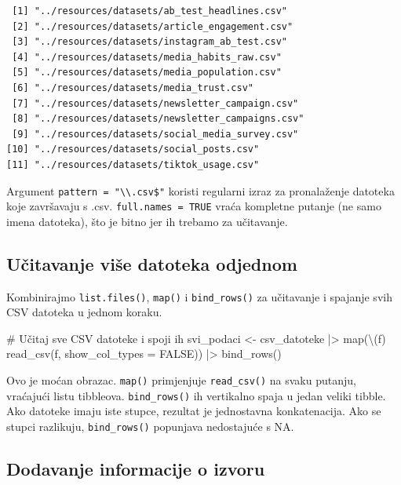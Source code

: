 \documentclass[
  croatian,
  letterpaper,
  DIV=11,
  numbers=noendperiod]{scrartcl}
\newenvironment{Shaded}{\begin{snugshade}}{\end{snugshade}}
\newcommand{\AttributeTok}[1]{\textcolor[rgb]{0.40,0.45,0.13}{#1}}
\newcommand{\CommentTok}[1]{\textcolor[rgb]{0.37,0.37,0.37}{#1}}
\newcommand{\ConstantTok}[1]{\textcolor[rgb]{0.56,0.35,0.01}{#1}}
\newcommand{\FunctionTok}[1]{\textcolor[rgb]{0.28,0.35,0.67}{#1}}
\newcommand{\NormalTok}[1]{\textcolor[rgb]{0.00,0.23,0.31}{#1}}
\newcommand{\OtherTok}[1]{\textcolor[rgb]{0.00,0.23,0.31}{#1}}
\newcommand{\SpecialCharTok}[1]{\textcolor[rgb]{0.37,0.37,0.37}{#1}}
\begin{document}
\begin{verbatim}
 [1] "../resources/datasets/ab_test_headlines.csv"   
 [2] "../resources/datasets/article_engagement.csv"  
 [3] "../resources/datasets/instagram_ab_test.csv"   
 [4] "../resources/datasets/media_habits_raw.csv"    
 [5] "../resources/datasets/media_population.csv"    
 [6] "../resources/datasets/media_trust.csv"         
 [7] "../resources/datasets/newsletter_campaign.csv" 
 [8] "../resources/datasets/newsletter_campaigns.csv"
 [9] "../resources/datasets/social_media_survey.csv" 
[10] "../resources/datasets/social_posts.csv"        
[11] "../resources/datasets/tiktok_usage.csv"        
\end{verbatim}

Argument \texttt{pattern\ =\ "\textbackslash{}\textbackslash{}.csv\$"}
koristi regularni izraz za pronalaženje datoteka koje završavaju s .csv.
\texttt{full.names\ =\ TRUE} vraća kompletne putanje (ne samo imena
datoteka), što je bitno jer ih trebamo za učitavanje.

\subsection{Učitavanje više datoteka
odjednom}\label{uux10ditavanje-viux161e-datoteka-odjednom}

Kombinirajmo \texttt{list.files()}, \texttt{map()} i
\texttt{bind\_rows()} za učitavanje i spajanje svih CSV datoteka u
jednom koraku.

\begin{Shaded}
\begin{Highlighting}[]
\CommentTok{\# Učitaj sve CSV datoteke i spoji ih}
\NormalTok{svi\_podaci }\OtherTok{\textless{}{-}}\NormalTok{ csv\_datoteke }\SpecialCharTok{|\textgreater{}}
  \FunctionTok{map}\NormalTok{(\textbackslash{}(f) }\FunctionTok{read\_csv}\NormalTok{(f, }\AttributeTok{show\_col\_types =} \ConstantTok{FALSE}\NormalTok{)) }\SpecialCharTok{|\textgreater{}}
  \FunctionTok{bind\_rows}\NormalTok{()}
\end{Highlighting}
\end{Shaded}

Ovo je moćan obrazac. \texttt{map()} primjenjuje \texttt{read\_csv()} na
svaku putanju, vraćajući listu tibbleova. \texttt{bind\_rows()} ih
vertikalno spaja u jedan veliki tibble. Ako datoteke imaju iste stupce,
rezultat je jednostavna konkatenacija. Ako se stupci razlikuju,
\texttt{bind\_rows()} popunjava nedostajuće s NA.

\subsection{Dodavanje informacije o
izvoru}\label{dodavanje-informacije-o-izvoru}
\end{document}
